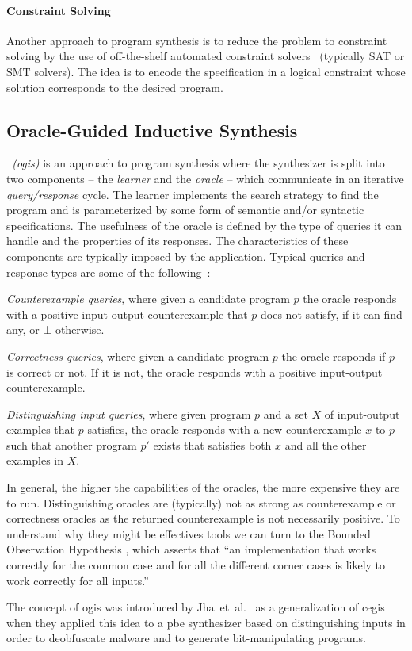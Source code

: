 \paragraph{Constraint Solving}
\label{sec:constraint-solving}

Another approach to program synthesis is to reduce the problem to 
constraint solving by the use of off-the-shelf automated constraint
solvers~\cite{Feng:2018:PSU,Feng:2017:CST,Feng:2017:CSC,Solar-Lezama:2008,Jha:oracle:2010}
(typically SAT or SMT solvers).
The idea is to encode the specification in a logical constraint whose solution
corresponds to the desired program.

\subsection{Oracle-Guided Inductive Synthesis}
\label{sec:ogis}

\textit{~(\Gls{ogis})} is an approach to program synthesis
where the synthesizer is split into two components -- the \textit{learner} and the
\textit{oracle} -- which communicate in an iterative \textit{query/response}
cycle.
The learner implements the search strategy to find the program and is
parameterized by some form of semantic and/or syntactic specifications.
The usefulness of the oracle is defined by the type of queries it can handle and
the properties of its responses. The characteristics of these components are
typically imposed by the application.
Typical queries and response types are some of the following~\cite{Jha:2017:TFS}:
%
\begin{compactitem}
\item \textit{Counterexample queries}, where given a candidate program $p$ the
  oracle responds with a positive input-output counterexample that $p$ does not
  satisfy, if it can find any, or $\bot$ otherwise.
\item \textit{Correctness queries}, where given a candidate program $p$ the
  oracle responds if $p$ is correct or not. If it is not, the oracle responds
  with a positive input-output counterexample.
\item \textit{Distinguishing input queries}, where given program $p$ and a set
  $X$ of input-output examples that $p$ satisfies, the oracle responds with a
  new counterexample $x$ to $p$ such that another program $p'$ exists that
  satisfies both $x$ and all the other examples in $X$.
\end{compactitem}

In general, the higher the capabilities of the oracles, the more expensive they
are to run. Distinguishing oracles are (typically) not as strong as
counterexample or correctness oracles as the returned counterexample is not
necessarily positive. To understand why they might be effectives tools we can
turn to the Bounded Observation Hypothesis \cite{Solar-Lezama:2008}, which
asserts that ``an implementation that works correctly for the common case and
for all the different corner cases is likely to work correctly for all inputs.''

The concept of \gls{ogis} was introduced by Jha~et~al.~\cite{Jha:oracle:2010}
as a generalization of \gls{cegis} when they applied this idea to a \gls{pbe}
synthesizer based on distinguishing inputs in order to deobfuscate malware and
to generate bit-manipulating programs.
